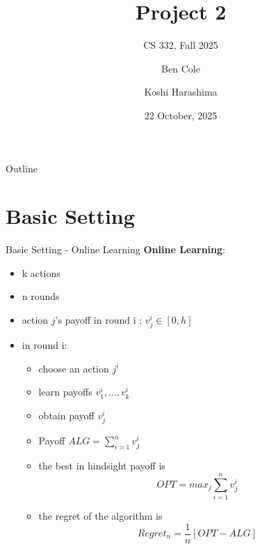 \documentclass{beamer}
\title[Project 2]{Project 2}
\subtitle{CS 332, Fall 2025}
\author{Ben Cole \and Koshi Harashima}
\date{22 October, 2025}
\begin{document}
\maketitle

\begin{frame}{Outline}
  \tableofcontents
\end{frame}

\section{Basic Setting}

\begin{frame}{Basic Setting - Online Learning}
    \textbf{Online Learning}: 
    \begin{itemize}
        \item k actions
        \item n rounds
        \item action $j$'s payoff in round i ; $v_j^i \in [0,h]$
        \item in round i:
        \begin{itemize}
            \item choose an action $j^i$
            \item learn payoffs $v_1^i, \dots, v_k^i$
            \item obtain payoff $v_j^i$
        \item Payoff $ALG = \sum_{i = 1} ^n v_j^i$
        \item the best in hindsight payoff is 
        \[
        OPT = max_j \sum_{i = 1} ^n v_j^i
        \]
        \item the regret of the algorithm is 
        \[
        Regret_n = \frac{1}{n}[OPT - ALG]
        \]
        \end{itemize}
    \end{itemize}
\end{frame}
\end{document}
